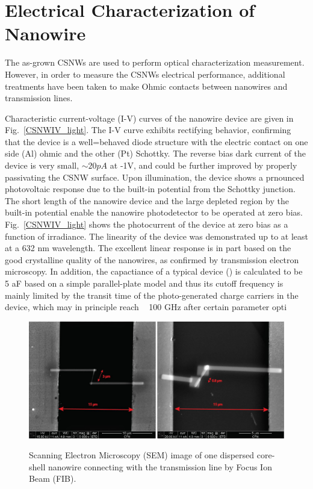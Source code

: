 \section{Electrical Characterization of Nanowire}

The as-grown CSNWs are used to perform optical characterization measurement.
However, in order to measure the CSNWs electrical performance, additional
treatments have been taken to make Ohmic contacts between nanowires and
transmission lines.

Characteristic current-voltage (I-V) curves of the nanowire device are given in
Fig.~\ref{CSNWIV_light}. The I-V curve exhibits rectifying behavior, confirming
that the device is a well=behaved diode structure with the electric contact on
one side (Al) ohmic and the other (Pt) Schottky. The reverse bias dark current
of the device is very small, $\sim20pA$ at -1V, and could be further improved
by properly passivating the CSNW surface. Upon illumination, the device shows a
prnounced photovoltaic response due to the built-in potential from the Schottky
junction. The short length of the nanowire device and the large depleted region
by the built-in potential enable the nanowire photodetector to be operated at
zero bias. Fig.~\ref{CSNWIV_light} shows the photocurrent of the device at zero
bias as a function of irradiance. The linearity of the device was demonstrated
up to at least at a 632 nm wavelength. The excellent linear response is in part
based on the good crystalline quality of the nanowires, as confirmed by
transmission electron microscopy. In addition, the capactiance of a typical
device () is calculated to be 5 aF based on a simple parallel-plate model and
thus its cutoff frequency is mainly limited by the transit time of the
photo-generated charge carriers in the device, which may in principle reach ~
100 GHz after certain parameter opti 

\begin{figure}
  \caption{Scanning Electron Microscopy (SEM) image of one dispersed core-shell nanowire connecting with the transmission line by Focus Ion Beam (FIB).}
  \centering
  \includegraphics[width=\textwidth]{pictures/Data/ContactNW}
  \label{ContactNW}
\end{figure}

